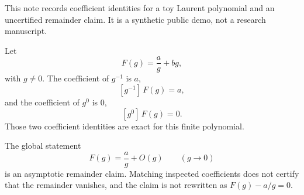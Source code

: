\documentclass{article}
\begin{document}
This note records coefficient identities for a toy Laurent polynomial
and an uncertified remainder claim. It is a synthetic public demo, not
a research manuscript.

Let
\begin{equation}
\label{eq:F}
F(g) = \frac{a}{g} + b g,
\end{equation}
with $g\neq 0$. The coefficient of $g^{-1}$ is $a$,
\begin{equation}
\label{eq:coeff-inv}
[g^{-1}]\,F(g) = a,
\end{equation}
and the coefficient of $g^{0}$ is $0$,
\begin{equation}
\label{eq:coeff-const}
[g^{0}]\,F(g) = 0.
\end{equation}
Those two coefficient identities are exact for this finite polynomial.

The global statement
\begin{equation}
\label{eq:asymptotic}
F(g) = \frac{a}{g} + O(g)
\qquad (g\to 0)
\end{equation}
is an asymptotic remainder claim. Matching inspected coefficients does
not certify that the remainder vanishes, and the claim is not rewritten
as $F(g)-a/g=0$.
\end{document}
